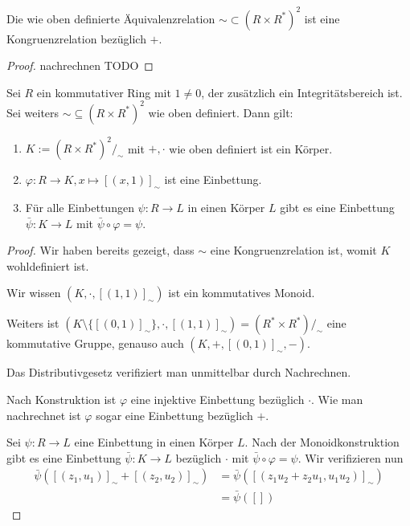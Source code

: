 \begin{lemma}
    Die wie oben definierte Äquivalenzrelation $\sim \subset (R \times R^*)^2$ ist eine Kongruenzrelation bezüglich $+$.
\end{lemma}

\begin{proof}
    nachrechnen TODO
\end{proof}

\begin{theorem}
    Sei $R$ ein kommutativer Ring mit $1 \neq 0$, der zusätzlich ein Integritätsbereich ist. Sei weiters $\sim \subseteq (R \times R^*)^2$ wie oben definiert. Dann gilt:
    \begin{enumerate}
        \item $K := (R \times R^*)^2/_\sim $ mit $+, \cdot$ wie oben definiert ist ein Körper.
        \item $\varphi : R \to K, x \mapsto [(x, 1)]_\sim$ ist eine Einbettung.
        \item Für alle Einbettungen $\psi : R \to L$ in einen Körper $L$ gibt es eine Einbettung $\bar{\psi} : K \to L$ mit $\bar{\psi} \circ \varphi = \psi$.
    \end{enumerate}
\end{theorem}

\begin{proof}
    Wir haben bereits gezeigt, dass $\sim$ eine Kongruenzrelation ist, womit $K$ wohldefiniert ist.

    Wir wissen $(K, \cdot, [(1,1)]_\sim)$ ist ein kommutatives Monoid.

    Weiters ist $(K \setminus \{ [(0,1)]_\sim \}, \cdot, [(1, 1)]_\sim) = (R^* \times R^*)/_\sim$ eine kommutative Gruppe, genauso auch $(K, +, [(0,1)]_\sim, -)$.

    Das Distributivgesetz verifiziert man unmittelbar durch Nachrechnen.

    Nach Konstruktion ist $\varphi$ eine injektive Einbettung bezüglich $\cdot$. Wie man nachrechnet ist $\varphi$ sogar eine Einbettung bezüglich $+$.

    Sei $\psi : R \to L$ eine Einbettung in einen Körper $L$. Nach der Monoidkonstruktion gibt es eine Einbettung $\bar{\psi} : K \to L$ bezüglich $\cdot$ mit $\bar{\psi} \circ \varphi = \psi$. Wir verifizieren nun
    \begin{align*}
        \bar{\psi} ([(z_1, u_1)]_\sim + [(z_2, u_2)]_\sim) &= \bar{\psi} ([(z_1 u_2 + z_2 u_1, u_1 u_2)]_\sim) \\
        &= \bar{\psi}([])
    \end{align*}
\end{proof}

